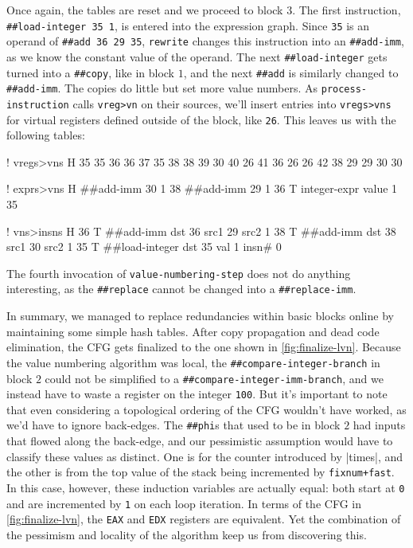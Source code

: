 Once again, the tables are reset and we proceed to block $3$.  The first
instruction,
%
\Verb|##load-integer 35 1|,
%
is entered into the expression graph.  Since \Verb|35| is an operand of
%
\Verb|##add 36 29 35|,
%
\Verb|rewrite| changes this instruction into an \Verb|##add-imm|, as we know
the constant value of the operand.  The next \Verb|##load-integer| gets turned
into a \Verb|##copy|, like in block $1$, and the next \Verb|##add| is similarly
changed to \Verb|##add-imm|.  The copies do little but set more value numbers.
As \Verb|process-instruction| calls \Verb|vreg>vn| on their sources, we'll
insert entries into \Verb|vregs>vns| for virtual registers defined outside of
the block, like \Verb|26|.  This leaves us with the following tables:
%
  \begin{factorcode}
    ! vregs>vns
    H{
        { 35 35 }
        { 36 36 }
        { 37 35 }
        { 38 38 }
        { 39 30 }
        { 40 26 }
        { 41 36 }
        { 26 26 }
        { 42 38 }
        { 29 29 }
        { 30 30 }
    }

    ! exprs>vns
    H{
        { { ##add-imm 30 1 } 38 }
        { { ##add-imm 29 1 } 36 }
        { T{ integer-expr { value 1 } } 35 }
    }

    ! vns>insns
    H{
        { 36 T{ ##add-imm { dst 36 } { src1 29 } { src2 1 } } }
        { 38 T{ ##add-imm { dst 38 } { src1 30 } { src2 1 } } }
        { 35 T{ ##load-integer { dst 35 } { val 1 } { insn# 0 } } }
    }
  \end{factorcode}
%
\noindent The fourth invocation of \Verb|value-numbering-step| does not do
anything interesting, as the \Verb|##replace| cannot be changed into a
\Verb|##replace-imm|.

In summary, we managed to replace redundancies within basic blocks online by
maintaining some simple hash tables.  After copy propagation and dead code
elimination, the \gls{CFG} gets finalized to the one shown in
\vref{fig:finalize-lvn}.  Because the value numbering algorithm was local, the
\Verb|##compare-integer-branch| in block $2$ could not be simplified to a
\Verb|##compare-integer-imm-branch|, and we instead have to waste a register on
the integer \Verb|100|.  But it's important to note that even considering a
topological ordering of the \gls{CFG} wouldn't have worked, as we'd have to
ignore back-edges.  The \Verb|##phi|s that used to be in block $2$ had inputs
that flowed along the back-edge, and our pessimistic assumption would have to
classify these values as distinct.  One is for the counter introduced by
\factor|times|, and the other is from the top value of the stack being
incremented by \Verb|fixnum+fast|.  In this case, however, these induction
variables are actually equal: both start at \Verb|0| and are incremented by
\Verb|1| on each loop iteration.  In terms of the \gls{CFG} in
\vref{fig:finalize-lvn}, the \Verb|EAX| and \Verb|EDX| registers are
equivalent.  Yet the combination of the pessimism and locality of the algorithm
keep us from discovering this.

